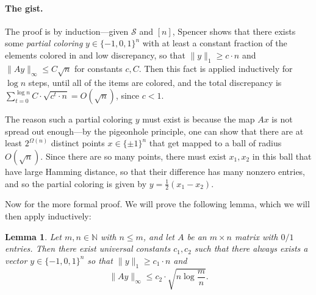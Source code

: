 \documentclass{article}
\theoremstyle{theorem}
\newtheorem{lemma}{Lemma}
\theoremstyle{definition}
\newcommand{\N}{\mathbb{N}}
\newcommand{\cS}{\mathcal{S}}
\begin{document}
\paragraph{The gist.}
The proof is by induction---given $\cS$ and $[n]$, Spencer shows that there exists some \emph{partial coloring} $y \in \{-1,0,1\}^n$ with at least a constant fraction of the elements colored in and low discrepancy, so that $\|y\|_1 \ge c\cdot n$ and $\|Ay\|_{\infty} \le C\sqrt{n}$ for constants $c,C$.
Then this fact is applied inductively for $\log n$ steps, until all of the items are colored, and the total discrepancy is $\sum_{t=0}^{\log n} C\cdot \sqrt{c^t\cdot n} = O(\sqrt{n})$, since $c < 1$.

The reason such a partial coloring $y$ must exist is because the map $Ax$ is not spread out enough---by the pigeonhole principle, one can show that there are at least $2^{\Omega(n)}$ distinct points $x \in \{\pm 1\}^n$ that get mapped to a ball of radius $O(\sqrt{n})$.
Since there are so many points, there must exist $x_1,x_2$ in this ball that have large Hamming distance, so that their difference has many nonzero entries, and so the partial coloring is given by $y = \frac{1}{2}(x_1-x_2)$.
\medskip

Now for the more formal proof.
We will prove the following lemma, which we will then apply inductively:
\begin{lemma}
Let $m,n \in \N$ with $n \le m$, and let $A$ be an $m \times n$ matrix with $0/1$ entries.
    Then there exist universal constants $c_1,c_2$ such that there always exists a vector $y \in \{-1,0,1\}^n$ so that $\|y\|_1 \ge c_1 \cdot n$ and
\[
    \|Ay\|_{\infty} \le c_2\cdot \sqrt{n\log\frac{m}{n}}.
\]
\end{lemma}
\end{document}
